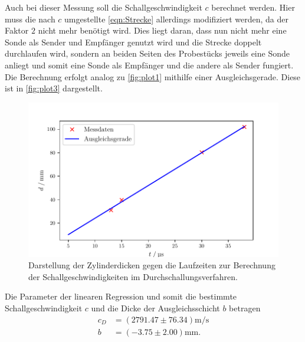 Auch bei dieser Messung soll die Schallgeschwindigkeit $c$ berechnet werden.
Hier muss die nach $c$ umgestellte \autoref{eqn:Strecke} allerdings modifiziert werden, da der Faktor $2$ nicht mehr benötigt wird.
Dies liegt daran, dass nun nicht mehr eine Sonde als Sender und Empfänger genutzt wird und die Strecke doppelt durchlaufen wird, 
sondern an beiden Seiten des Probestücks jeweils eine Sonde anliegt und somit eine Sonde als Empfänger und die andere als Sender fungiert.
Die Berechnung erfolgt analog zu \autoref{fig:plot1} mithilfe einer Ausgleichsgerade. Diese ist in \autoref{fig:plot3} dargestellt.
\begin{figure}[H]
  \centering
  \includegraphics{build/plot3.pdf}
  \caption {Darstellung der Zylinderdicken gegen die Laufzeiten zur Berechnung der Schallgeschwindigkeiten im Durchschallungsverfahren.}
  \label{fig:plot3}
\end{figure}
Die Parameter der linearen Regression und somit die bestimmte Schallgeschwindigkeit $c$ und die Dicke der Ausgleichsschicht $b$ betragen
\begin{align*}
  c_{D}& =( 2791.47\pm 76.34 ) \si{\meter\per\second}\\
  b &= (-3.75\pm 2.00) \si{\milli\meter}.
\end{align*}

